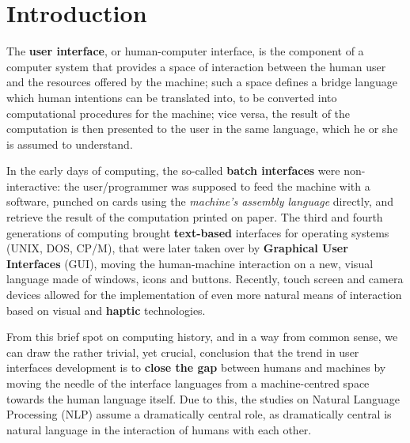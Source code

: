 
\chapter{Introduction} %

\label{ch:Introduction} %




The \textbf{user interface}, or human-computer interface, is the component of a computer system that provides a space of interaction between the human user and the resources offered by the machine; such a space defines a bridge language which human intentions can be translated into, to be converted into computational procedures for the machine; vice versa, the result of the computation is then presented to the user in the same language, which he or she is assumed to understand.

In the early days of computing, the so-called \textbf{batch interfaces} were non-interactive: the user/programmer was supposed to feed the machine with a software, punched on cards using the \textit{machine's assembly language} directly, and retrieve the result of the computation printed on paper. The third and fourth generations of computing brought \textbf{text-based} interfaces for operating systems (UNIX, DOS, CP/M), that were later taken over by \textbf{Graphical User Interfaces} (GUI), moving the human-machine interaction on a new, visual language made of windows, icons and buttons. Recently, touch screen and camera devices allowed for the implementation of even more natural means of interaction based on visual and \textbf{haptic} technologies.

From this brief spot on computing history, and in a way from common sense, we can draw the rather trivial, yet crucial, conclusion that the trend in user interfaces development is to \textbf{close the gap} between humans and machines by moving the needle of the interface languages from a machine-centred space towards the human language itself. Due to this, the studies on Natural Language Processing (NLP) assume a dramatically central role, as dramatically central is natural language in the interaction of humans with each other.

